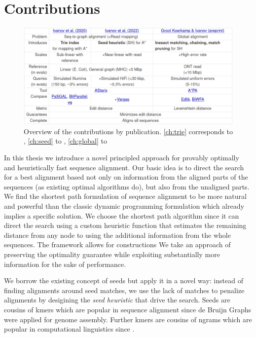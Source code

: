 \section*{Contributions}


\begin{figure}[h]
  \includegraphics[width=1.0\linewidth]{media/ownpubs-table.png}
  \caption{Overview of the contributions by publication. \cref{ch:trie}
  corresponds to \citep{ivanov2020astarix}, \cref{ch:seed} to
  \citep{ivanov2022fast}, \cref{ch:global} to \citep{koerkamp2022exact}}
  \label{tab:ownpubs}
\end{figure}

In this thesis we introduce a novel principled approach for provably optimally
and heuristically fast sequence alignment. Our basic idea is to direct the
search for a best alignment based not only on information from the aligned parts
of the sequences (as existing optimal algorithms do), but also from the
unaligned parts. We find the shortest path formulation of sequence alignment to
be more natural and powerful than the classic dynamic programming formulation
which already implies a specific solution. We choose the \A shortest path
algorithm since it can direct the search using a custom heuristic function that
estimates the remaining distance from any node to using the additional information from the whole sequences.
The \A framework allows for constructions We take an approach of preserving the
optimality guarantee while exploiting substantially more information for the
sake of performance.

We borrow the existing concept of seeds but apply it in a novel way: instead of
finding alignments around seed matches, we use the lack of matches to penalize
alignments by desigining the \emph{seed heuristic} that drive the \A search.
Seeds are cousins of kmers which are popular in sequence alignment since de
Bruijn Graphs were applied for genome assembly. Further kmers are cousins of
ngrams which are popular in computational linguistics since .

